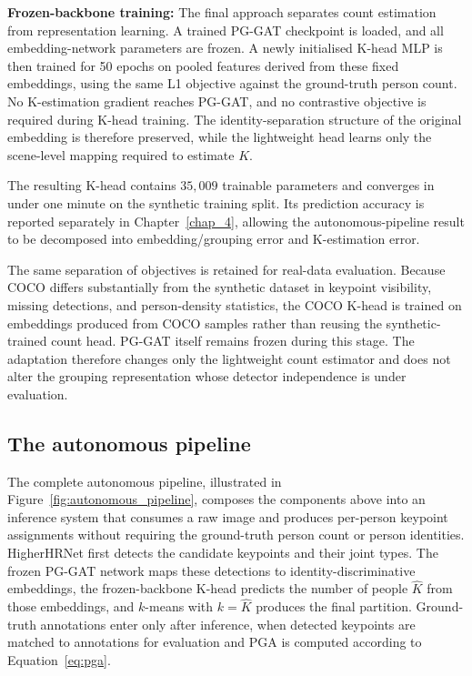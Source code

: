 \textbf{Frozen-backbone training:}
The final approach separates count estimation from representation
learning.
A trained PG-GAT checkpoint is loaded,
and all embedding-network parameters are frozen.
A newly initialised K-head MLP is then trained for 50 epochs
on pooled features derived from these fixed embeddings,
using the same L1 objective against the ground-truth person count.
No K-estimation gradient reaches PG-GAT,
and no contrastive objective is required during K-head training.
The identity-separation structure of the original embedding
is therefore preserved,
while the lightweight head learns only the scene-level mapping
required to estimate $K$.

The resulting K-head contains $35{,}009$ trainable
parameters and converges in under one minute on the synthetic training
split.
Its prediction accuracy is reported separately in
Chapter~\ref{chap_4},
allowing the autonomous-pipeline result to be decomposed into
embedding/grouping error and K-estimation error.

The same separation of objectives is retained for real-data
evaluation.
Because COCO differs substantially from the synthetic dataset
in keypoint visibility,
missing detections,
and person-density statistics,
the COCO K-head is trained on embeddings produced from COCO samples
rather than reusing the synthetic-trained count head.
PG-GAT itself remains frozen during this stage.
The adaptation therefore changes only the lightweight count estimator
and does not alter the grouping representation whose detector independence
is under evaluation.

\subsection{The autonomous pipeline}
\label{sec_meth_integration_autonomous}

The complete autonomous pipeline, illustrated in
Figure~\ref{fig:autonomous_pipeline},
composes the components above into an inference system
that consumes a raw image and produces per-person keypoint assignments
without requiring the ground-truth person count or person identities.
HigherHRNet first detects the candidate keypoints and their joint types.
The frozen PG-GAT network maps these detections
to identity-discriminative embeddings,
the frozen-backbone K-head predicts the number of people $\hat{K}$
from those embeddings,
and $k$-means with $k=\hat{K}$ produces the final partition.
Ground-truth annotations enter only after inference,
when detected keypoints are matched to annotations for evaluation
and PGA is computed according to Equation~\eqref{eq:pga}.

